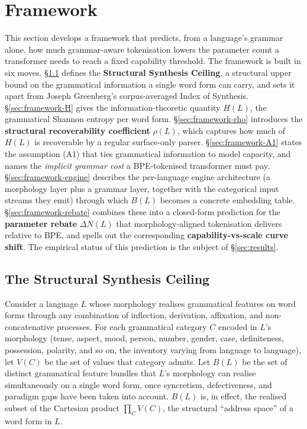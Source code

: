 \section{Framework}
\label{sec:framework}

This section develops a framework that predicts, from a language's grammar alone, how much grammar-aware tokenisation lowers the parameter count a transformer needs to reach a fixed capability threshold. The framework is built in six moves. \S\ref{sec:framework-ssc} defines the \textbf{Structural Synthesis Ceiling}, a structural upper bound on the grammatical information a single word form can carry, and sets it apart from Joseph Greenberg's corpus-averaged Index of Synthesis. \S\ref{sec:framework-H} gives the information-theoretic quantity $H(L)$, the grammatical Shannon entropy per word form. \S\ref{sec:framework-rho} introduces the \textbf{structural recoverability coefficient} $\rho(L)$, which captures how much of $H(L)$ is recoverable by a regular surface-only parser. \S\ref{sec:framework-A1} states the assumption (A1) that ties grammatical information to model capacity, and names the \emph{implicit grammar cost} a BPE-tokenised transformer must pay. \S\ref{sec:framework-engine} describes the per-language engine architecture (a morphology layer plus a grammar layer, together with the categorical input streams they emit) through which $B(L)$ becomes a concrete embedding table. \S\ref{sec:framework-rebate} combines these into a closed-form prediction for the \textbf{parameter rebate} $\Delta N(L)$ that morphology-aligned tokenisation delivers relative to BPE, and spells out the corresponding \textbf{capability-vs-scale curve shift}. The empirical status of this prediction is the subject of \S\ref{sec:results}.

\subsection{The Structural Synthesis Ceiling}
\label{sec:framework-ssc}

Consider a language $L$ whose morphology realises grammatical features on word forms through any combination of inflection, derivation, affixation, and non-concatenative processes. For each grammatical category $C$ encoded in $L$'s morphology (tense, aspect, mood, person, number, gender, case, definiteness, possession, polarity, and so on, the inventory varying from language to language), let $V(C)$ be the set of values that category admits. Let $B(L)$ be the set of distinct grammatical feature bundles that $L$'s morphology can realise simultaneously on a single word form, once syncretism, defectiveness, and paradigm gaps have been taken into account. $B(L)$ is, in effect, the realised subset of the Cartesian product $\prod_C V(C)$, the structural ``address space'' of a word form in $L$.

